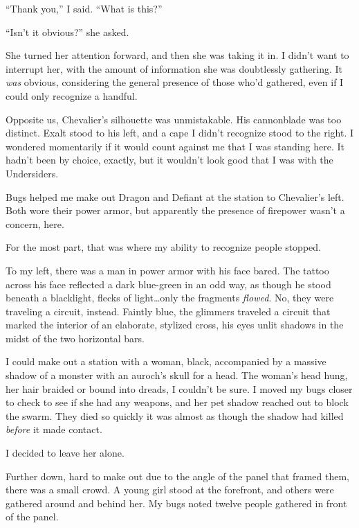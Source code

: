 ``Thank you,'' I said.  ``What is this?''



``Isn't it obvious?'' she asked.



She turned her attention forward, and then she was taking it in.  I didn't want to interrupt her, with the amount of information she was doubtlessly gathering.  It \emph{was }obvious, considering the general presence of those who'd gathered, even if I could only recognize a handful.



Opposite us, Chevalier's silhouette was unmistakable.  His cannonblade was too distinct.  Exalt stood to his left, and a cape I didn't recognize stood to the right.  I wondered momentarily if it would count against me that I was standing here.  It hadn't been by choice, exactly, but it wouldn't look good that I was with the Undersiders.



Bugs helped me make out Dragon and Defiant at the station to Chevalier's left.  Both wore their power armor, but apparently the presence of firepower wasn't a concern, here.



For the most part, that was where my ability to recognize people stopped.



To my left, there was a man in power armor with his face bared.  The tattoo across his face reflected a dark blue-green in an odd way, as though he stood beneath a blacklight, flecks of light\ldots only the fragments \emph{flowed}.  No, they were traveling a circuit, instead.  Faintly blue, the glimmers traveled a circuit that marked the interior of an elaborate, stylized cross, his eyes unlit shadows in the midst of the two horizontal bars.



I could make out a station with a woman, black, accompanied by a massive shadow of a monster with an auroch's skull for a head.  The woman's head hung, her hair braided or bound into dreads, I couldn't be sure.  I moved my bugs closer to check to see if she had any weapons, and her pet shadow reached out to block the swarm.  They died so quickly it was almost as though the shadow had killed \emph{before} it made contact.



I decided to leave her alone.



Further down, hard to make out due to the angle of the panel that framed them, there was a small crowd.  A young girl stood at the forefront, and others were gathered around and behind her.  My bugs noted twelve people gathered in front of the panel.



